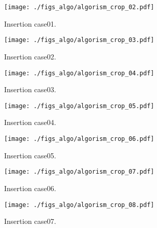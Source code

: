 \begin{figure}[h]
  \vspace{-0.5cm}
  \texttt{[image: ./figs\_algo/algorism\_crop\_02.pdf]}
  \caption{
    Insertion case01.
  }
  \label{fig_IpCHashT_insert_hard_case01}
  \vspace{-0.5cm}
\end{figure}

\begin{figure}[h]
  \vspace{-0.5cm}
  \texttt{[image: ./figs\_algo/algorism\_crop\_03.pdf]}
  \caption{
    Insertion case02.
  }
  \label{fig_IpCHashT_insert_hard_case02}
  \vspace{-0.5cm}
\end{figure}

\begin{figure}[h]
  \vspace{-0.5cm}
  \texttt{[image: ./figs\_algo/algorism\_crop\_04.pdf]}
  \caption{
    Insertion case03.
  }
  \label{fig_IpCHashT_insert_hard_case03}
  \vspace{-0.5cm}
\end{figure}

\begin{figure}[h]
  \vspace{-0.5cm}
  \texttt{[image: ./figs\_algo/algorism\_crop\_05.pdf]}
  \caption{
    Insertion case04.
  }
  \label{fig_IpCHashT_insert_hard_case04}
  \vspace{-0.5cm}
\end{figure}

\begin{figure}[h]
  \vspace{-0.5cm}
  \texttt{[image: ./figs\_algo/algorism\_crop\_06.pdf]}
  \caption{
    Insertion case05.
  }
  \label{fig_IpCHashT_insert_hard_case06}
  \vspace{-0.5cm}
\end{figure}

\begin{figure}[h]
  \vspace{-0.5cm}
  \texttt{[image: ./figs\_algo/algorism\_crop\_07.pdf]}
  \caption{
    Insertion case06.
  }
  \label{fig_IpCHashT_insert_hard_case11}
  \vspace{-0.5cm}
\end{figure}

\begin{figure}[h]
  \vspace{-0.5cm}
  \texttt{[image: ./figs\_algo/algorism\_crop\_08.pdf]}
  \caption{
    Insertion case07.
  }
  \label{fig_IpCHashT_insert_hard_case05}
\end{figure}

